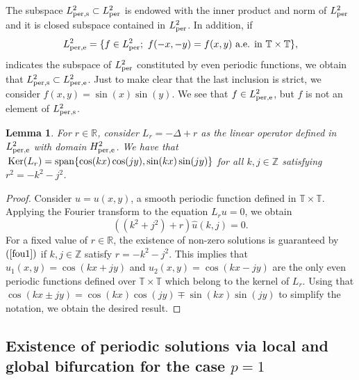 \documentclass[12pt,reqno,a4paper]{amsart} %
\newcommand{\Ker}{{\rm \,Ker}}
\numberwithin{equation}{section}
\numberwithin{figure}{section}
\newtheorem{lemma}[theorem]{Lemma}
\begin{document}
			The subspace $L_{\rm per,s}^2\subset L_{\rm per}^2$ is endowed with the inner product and norm of $L_{\rm per}^2$ and it is closed subspace contained in $L_{\rm per}^2$. In addition, if 			
			$$L_{\rm per,e}^2=\{f\in L_{\rm per}^2;\ f(-x,-y)=f(x,y)\ \mbox{a.e. in}\ \mathbb{T}\times\mathbb{T}\},$$
			indicates the subspace of $L_{\rm per}^2$ constituted by even periodic functions, we obtain that $L_{\rm per,s}^2\subset L_{\rm per,e}^2$. Just to make clear that the last inclusion  is strict, we consider $f(x,y)=\sin(x)\sin(y)$. We see that $f\in L_{\rm per,e}^2$, but $f$ is not an element of $L_{\rm per,s}^2$.
			
			\begin{lemma}\label{lema2} For $r\in\mathbb{R}$, consider $L_{r}=-\Delta +r$ as the linear operator defined in $L_{\rm per, e}^2$ with domain $H_{\rm per, e}^2$. We have that $\Ker(L_r)={\rm span}\{\cos(kx)\cos(jy),\sin(kx)\sin(jy)\}$ for all $k,j\in \mathbb{Z}$ satisfying $r^2=-k^2-j^2$.				
				\end{lemma}
				
			\begin{proof}
				Consider $u=u(x,y)$, a smooth periodic function defined in $\mathbb{T}\times\mathbb{T}$. Applying the Fourier transform to the equation $L_ru=0$, we obtain 
				\begin{equation}\label{fou1}
					((k^2+j^2)+r)\widehat{u}(k,j)=0.					
					\end{equation}
			For a fixed value of $r\in\mathbb{R}$, the existence of non-zero solutions is guaranteed by $(\ref{fou1})$ if $k,j\in\mathbb{Z}$ satisfy $r=-k^2-j^2$. This implies that $u_1(x,y)=\cos(kx+jy)$ and $u_2(x,y)=\cos(kx-jy)$ are the only even periodic functions defined over $\mathbb{T}\times\mathbb{T}$ which belong to the kernel of $L_r$. Using that $\cos(kx\pm jy)=\cos(kx)\cos(jy)\mp\sin(kx)\sin(jy)$ to simplify the notation, we obtain  the desired result.
				
			\end{proof}
			
			\subsection{Existence of periodic solutions via local and global bifurcation for the case $p=1$}
			
\end{document}
